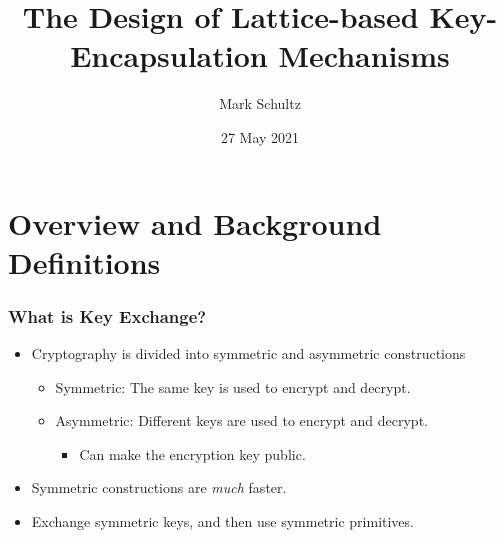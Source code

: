 \documentclass{beamer}
\title{The Design of Lattice-based Key-Encapsulation Mechanisms}
\author{Mark Schultz}
\institute{University of California San Diego}
\date{27 May 2021} %
\theoremstyle{definition}
\begin{document}
{
\begin{frame} 
\titlepage
\end{frame}
}


\section{Overview and Background Definitions}

\begin{frame}
	\frametitle{What is Key Exchange?}
	\begin{itemize}
		\item Cryptography is divided into \alert{symmetric} and \alert{asymmetric} constructions
		\begin{itemize}\pause
			\item \alert{Symmetric}: The same key is used to encrypt and decrypt.\pause
			\item \alert{Asymmetric}: Different keys are used to encrypt and decrypt.\pause
\begin{itemize}
	\item Can make the encryption key public.\pause
\end{itemize}
		\end{itemize}
	\item Symmetric constructions are \emph{much} faster.\pause
	\item \alert{Exchange} symmetric \alert{keys}, and then use symmetric primitives.
	\end{itemize}
\end{frame}
\end{document}
